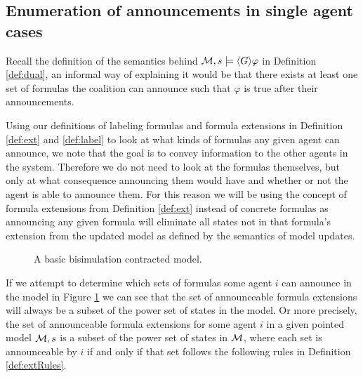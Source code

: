 
\subsection{Enumeration of announcements in single agent cases}

Recall the definition of the semantics behind $\mathcal{M},s \models \langle G\rangle\varphi$ in Definition \ref{def:dual}, an informal way of explaining it would be that there exists at least one set of formulas the coalition can announce such that $\varphi$ is true after their announcements. 

Using our definitions of labeling formulas and formula extensions in Definition \ref{def:ext} and \ref{def:label} to look at what kinds of formulas any given agent can announce, we note that the goal is to convey information to the other agents in the system. Therefore we do not need to look at the formulas themselves, but only at what consequence announcing them would have and whether or not the agent is able to announce them. For this reason we will be using the concept of formula extensions from Definition \ref{def:ext} instead of concrete formulas as announcing any given formula will eliminate all states not in that formula's extension from the updated model as defined by the semantics of model updates.

\begin{figure}[h]
	\centering
	\caption{A basic bisimulation contracted model.}
	\label{fig:GAexample}
\end{figure}

If we attempt to determine which sets of formulas some agent $i$ can announce in the model in Figure \ref{fig:GAexample} we can see that the set of announceable formula extensions will always be a subset of the power set of states in the model. Or more precisely, the set of announceable formula extensions for some agent $i$ in a given pointed model $\mathcal{M},s$ is a subset of the power set of states in $\mathcal{M}$, where each set is announceable by $i$ if and only if that set follows the following rules in Definition \ref{def:extRules}.

